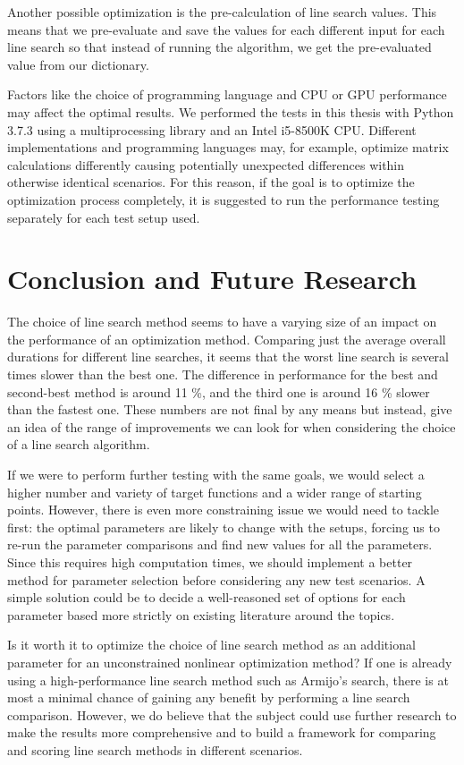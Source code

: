 \documentclass[a4paper,english,titlepage,12pt]{article}
\begin{document}
Another possible optimization is the pre-calculation of line search values. This means that we pre-evaluate and save the values for each different input for each line search so that instead of running the algorithm, we get the pre-evaluated value from our dictionary. \cite{book:convex_optimization}

Factors like the choice of programming language and CPU or GPU performance may affect the optimal results. We performed the tests in this thesis with Python 3.7.3 using a multiprocessing library and an Intel i5-8500K CPU. Different implementations and programming languages may, for example, optimize matrix calculations differently causing potentially unexpected differences within otherwise identical scenarios. For this reason, if the goal is to optimize the optimization process completely, it is suggested to run the performance testing separately for each test setup used.


\section{Conclusion and Future Research}


The choice of line search method seems to have a varying size of an impact on the performance of an optimization method. Comparing just the average overall durations for different line searches, it seems that the worst line search is several times slower than the best one. The difference in performance for the best and second-best method is around 11 \%, and the third one is around 16 \% slower than the fastest one. These numbers are not final by any means but instead, give an idea of the range of improvements we can look for when considering the choice of a line search algorithm.

If we were to perform further testing with the same goals, we would select a higher number and variety of target functions and a wider range of starting points. However, there is even more constraining issue we would need to tackle first: the optimal parameters are likely to change with the setups, forcing us to re-run the parameter comparisons and find new values for all the parameters. Since this requires high computation times, we should implement a better method for parameter selection before considering any new test scenarios. A simple solution could be to decide a well-reasoned set of options for each parameter based more strictly on existing literature around the topics.

Is it worth it to optimize the choice of line search method as an additional parameter for an unconstrained nonlinear optimization method? If one is already using a high-performance line search method such as Armijo's search, there is at most a minimal chance of gaining any benefit by performing a line search comparison. However, we do believe that the subject could use further research to make the results more comprehensive and to build a framework for comparing and scoring line search methods in different scenarios.
\end{document}
